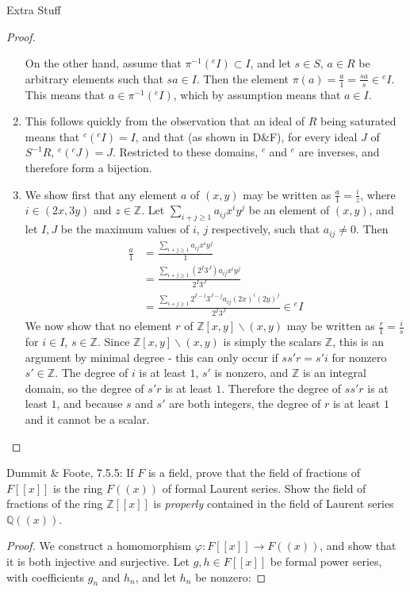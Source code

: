 \documentclass[12pt]{article}
\newcommand{\Q}{\mathbb{Q}}
\newcommand{\Z}{\mathbb{Z}}
\newcommand{\bs}{\backslash}
\theoremstyle{definition}
\newenvironment{problem}[2][Problem]{\begin{trivlist}
\item[\hskip \labelsep {\bfseries #1}\hskip \labelsep {\bfseries #2.}]}{\end{trivlist}}
\begin{document}
\begin{section}{Extra Stuff}
\begin{proof}
\begin{enumerate}[label=(\alph*)]
				\par On the other hand, assume that $\pi^{-1}(^eI) \subset I$, and let $s \in S$, $a \in R$ be arbitrary elements such that $sa \in I$. Then the element $\pi(a) = \frac{a}{1} = \frac{sa}{s} \in {}^eI$. This means that $a \in \pi^{-1}(^eI)$, which by assumption means that $a \in I$.
			\item This follows quickly from the observation that an ideal of $R$ being saturated means that $^c(^eI) = I$, and that (as shown in D\&F), for every ideal $J$ of $S^{-1}R$, $^e(^cJ) = J$. Restricted to these domains, $^c$ and $^e$ are inverses, and therefore form a bijection.
			\item We show first that any element $a$ of $(x,y)$ may be written as $\frac{a}{1 } = \frac{i}{z}$, where $i \in (2x, 3y) $ and $z \in \Z$. Let $\sum_{i + j \geq 1} a_{ij}x^iy^j$ be an element of $(x,y)$, and let $I, J$ be the maximum values of $i$, $j$ respectively, such that $a_{ij} \neq 0$. Then 
				\begin{align*} 
				\frac{a}{1} &= \frac{\sum_{i + j \geq 1}a_{ij}x^iy^j}{1} \\
			&= \frac{\sum_{i + j \geq 1}(2^I3^J)a_{ij}x^iy^j}{2^I3^J} \\
			&= \frac{\sum_{i + j \geq 1}2^{I - i}3^{J-j}a_{ij}(2x)^i(2y)^j}{2^I3^J}  \in {^e}I
		\end{align*}
		We now show that no element $r$ of $\Z[x,y] \bs (x,y)$ may be written as $\frac{r}{1} = \frac{i}{s}$ for $i\in I$, $s \in \Z$. Since $\Z[x,y]\bs (x,y)$ is simply the scalars $\Z$, this is an argument by minimal degree - this can only occur if $ss'r = s'i$ for nonzero $s' \in \Z$. The degree of $i$ is at least $1$, $s'$ is nonzero, and $\Z$ is an integral domain, so the degree of $s'r$ is at least $1$. Therefore the degree of $ss'r $ is at least $1$, and because $s$ and $s'$ are both integers, the degree of $r$ is at least $1$ and it cannot be a scalar.
		\end{enumerate}
	\end{proof}
	\begin{problem}{2}
		Dummit \& Foote, 7.5.5: If $F$ is a field, prove that the field of fractions of $F[ [x]]$ is the ring $F( (x))$ of formal Laurent series. Show the field of fractions of the ring $\Z[ [x]]$ is \textit{properly} contained in the field of Laurent series $\Q( (x))$. 
	\end{problem}
	\begin{proof}
		We construct a homomorphism $\varphi : F[ [x]] \to F( (x))$, and show that it is both injective and surjective. Let $g, h \in F[ [x]]$ be formal power series, with coefficients $g_n$ and $h_n$, and let $h_n$ be nonzero:

\end{proof}
\end{section}
\end{document}
